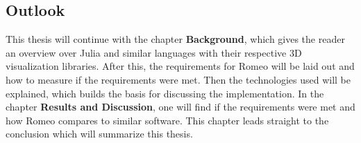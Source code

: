 \subsection{Outlook}
This thesis will continue with the chapter \textbf{Background}, which gives the reader an overview over Julia and similar languages with their respective 3D visualization libraries.
After this, the requirements for Romeo will be laid out and how to measure if the requirements were met.
Then the technologies used will be explained, which builds the basis for discussing the implementation.
In the chapter \textbf{Results and Discussion}, one will find if the requirements were met and how Romeo compares to similar software.
This chapter leads straight to the conclusion which will summarize this thesis.
